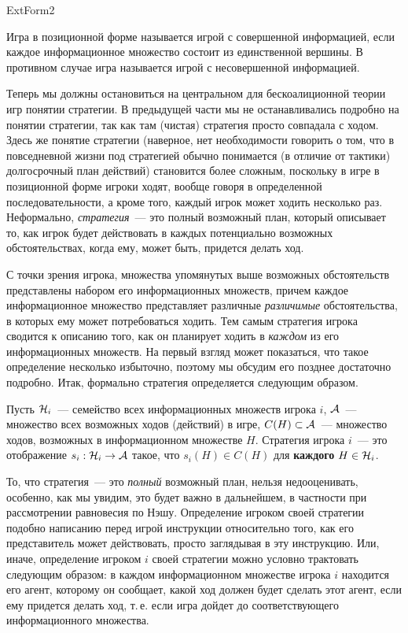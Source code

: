 ExtForm2


\begin{definition}
Игра в позиционной форме называется игрой с совершенной информацией,
если каждое информационное множество состоит из единственной
вершины. В противном случае игра называется игрой с несовершенной
информацией.
\end{definition}

Теперь мы должны остановиться на центральном для бескоалиционной
теории игр понятии стратегии. В предыдущей части мы не
останавливались подробно на понятии стратегии, так как там (чистая)
стратегия просто совпадала с ходом. Здесь же понятие стратегии
(наверное, нет необходимости говорить о том, что в повседневной
жизни под стратегией обычно понимается (в отличие от тактики)
долгосрочный план действий) становится более сложным, поскольку
в игре в позиционной форме игроки ходят, вообще говоря в
определенной последовательности, а кроме того, каждый игрок
может ходить несколько раз. Неформально, {\it стратегия}~--- это
полный возможный план, который описывает то, как игрок будет
действовать в каждых потенциально возможных обстоятельствах,
когда ему, может быть, придется делать ход.

С точки зрения игрока, множества упомянутых выше возможных обстоятельств
представлены набором его информационных множеств, причем каждое
информационное множество представляет различные {\it различимые}
обстоятельства, в которых ему может потребоваться ходить. Тем самым
стратегия игрока сводится к описанию того, как он планирует ходить в
{\it каждом} из его информационных множеств. На первый взгляд может
показаться, что такое определение несколько избыточно, поэтому мы
обсудим его позднее достаточно подробно. Итак, формально стратегия
определяется следующим образом.


\begin{definition}
Пусть ${\cal H}_i$~--- семейство всех информационных множеств игрока
$i$, ${\cal A}$~--- множество всех возможных ходов (действий) в
игре, $C(H)\subset {\cal A}$~---  множество ходов, возможных в
информационном множестве $H.$ Стратегия игрока $i$~--- это
отображение $s_i:{\cal H}_i\to{\cal A}$ такое, что $s_i(H)\in C(H)$
для {\bf каждого} $H\in{\cal H}_i$.
\end{definition}



То, что стратегия~--- это {\it полный} возможный план, нельзя
недооценивать, особенно, как мы увидим, это будет важно в
дальнейшем, в частности при рассмотрении равновесия по Нэшу.
Определение игроком своей стратегии подобно написанию
перед игрой инструкции относительно того, как его представитель
может действовать, просто заглядывая в эту инструкцию. Или, иначе,
определение игроком $i$ своей стратегии можно условно трактовать следующим
образом: в каждом информационном множестве игрока $i$ находится его
агент, которому он сообщает, какой ход должен будет сделать этот
агент, если ему придется делать ход, т.\,е. если игра дойдет до
соответствующего информационного множества.

